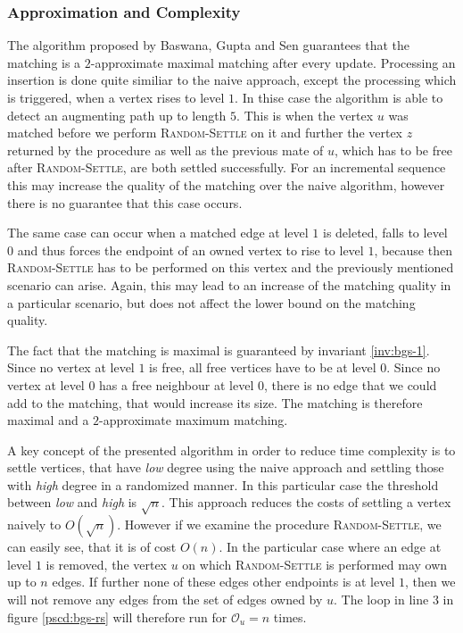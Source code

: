 \documentclass{article}      %
\begin{document}
\subsubsection{Approximation and Complexity}
\label{sec:bgs-approx-complex}

The algorithm proposed by Baswana, Gupta and Sen guarantees that the matching is a $2$-approximate maximal matching after every update. Processing an insertion is done quite similiar to the naive approach, except the processing which is triggered, when a vertex rises to level $1$. In thise case the algorithm is able to detect an augmenting path up to length $5$. This is when the vertex $u$ was matched before we perform \textsc{Random-Settle} on it and further the vertex $z$ returned by the procedure as well as the previous mate of $u$, which has to be free after \textsc{Random-Settle}, are both settled successfully. For an incremental sequence this may increase the quality of the matching over the naive algorithm, however there is no guarantee that this case occurs.

The same case can occur when a matched edge at level $1$ is deleted, falls to level $0$ and thus forces the endpoint of an owned vertex to rise to level $1$, because then \textsc{Random-Settle} has to be performed on this vertex and the previously mentioned scenario can arise. Again, this may lead to an increase of the matching quality in a particular scenario, but does not affect the lower bound on the matching quality.

The fact that the matching is maximal is guaranteed by invariant \ref{inv:bgs-1}. Since no vertex at level $1$ is free, all free vertices have to be at level $0$. Since no vertex at level $0$ has a free neighbour at level $0$, there is no edge that we could add to the matching, that would increase its size. The matching is therefore maximal and a $2$-approximate maximum matching.

\bigskip
\noindent
A key concept of the presented algorithm in order to reduce time complexity is to settle vertices, that have \emph{low} degree using the naive approach and settling those with \emph{high} degree in a randomized manner. In this particular case the threshold between \emph{low} and \emph{high} is $\sqrt{n}$. This approach reduces the costs of settling a vertex naively to $O(\sqrt{n})$. However if we examine the procedure \textsc{Random-Settle}, we can easily see, that it is of cost $O(n)$. In the particular case where an edge at level $1$ is removed, the vertex $u$ on which \textsc{Random-Settle} is performed may own up to $n$ edges. If further none of these edges other endpoints is at level $1$, then we will not remove any edges from the set of edges owned by $u$. The loop in line $3$ in figure \ref{pscd:bgs-rs} will therefore run for $\mathcal{O}_u = n$ times.
\end{document}
